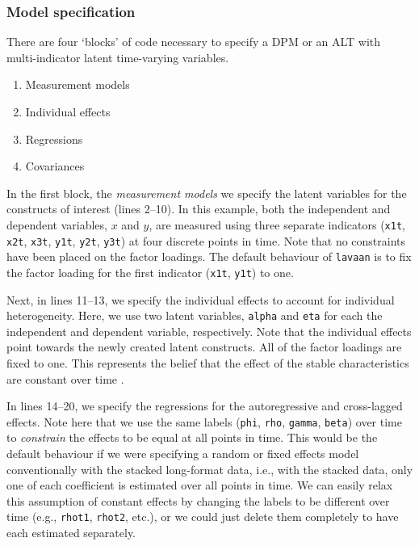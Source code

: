 \documentclass[]{interact}
\theoremstyle{plain}%
\theoremstyle{definition}
\theoremstyle{remark}
\begin{document}
\hypertarget{model-specification}{%
\subsubsection{Model specification}\label{model-specification}}

There are four `blocks' of code necessary to specify a DPM or an ALT
with multi-indicator latent time-varying variables.\\

\begin{enumerate}
\item Measurement models
\item Individual effects
\item Regressions
\item Covariances 
\end{enumerate}

In the first block, the \emph{measurement models} we specify the latent
variables for the constructs of interest (lines 2--10). In this example,
both the independent and dependent variables, \(x\) and \(y\), are
measured using three separate indicators (\texttt{x1t}, \texttt{x2t},
\texttt{x3t}, \texttt{y1t}, \texttt{y2t}, \texttt{y3t}) at four discrete
points in time. Note that no constraints have been placed on the factor
loadings. The default behaviour of \texttt{lavaan} is to fix the factor
loading for the first indicator (\texttt{x1t}, \texttt{y1t}) to one.

Next, in lines 11--13, we specify the individual effects to account for
individual heterogeneity. Here, we use two latent variables,
\texttt{alpha} and \texttt{eta} for each the independent and dependent
variable, respectively. Note that the individual effects point towards
the newly created latent constructs. All of the factor loadings are
fixed to one. This represents the belief that the effect of the stable
characteristics are constant over time \citep{Bollen2010}.

In lines 14--20, we specify the regressions for the autoregressive and
cross-lagged effects. Note here that we use the same labels
(\texttt{phi}, \texttt{rho}, \texttt{gamma}, \texttt{beta}) over time to
\emph{constrain} the effects to be equal at all points in time. This
would be the default behaviour if we were specifying a random or fixed
effects model conventionally with the stacked long-format data, i.e.,
with the stacked data, only one of each coefficient is estimated over
all points in time. We can easily relax this assumption of constant
effects by changing the labels to be different over time (e.g.,
\texttt{rhot1}, \texttt{rhot2}, etc.), or we could just delete them
completely to have each estimated separately.
\end{document}
